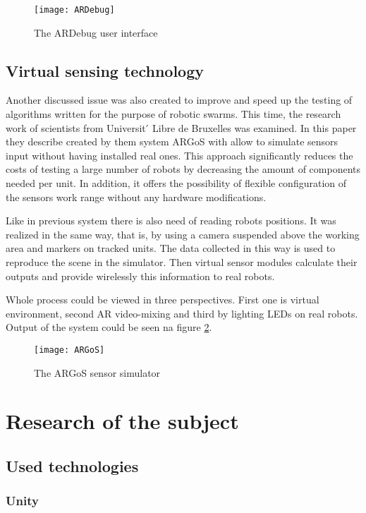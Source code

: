 \documentclass[printmode,en]{mgr}
\begin{document}
\begin{figure}[!ht]
  \centering
    \texttt{[image: ARDebug]}
  \caption{The ARDebug user interface \cite{ARDebug}}
  \label{fig:ARDebug}
\end{figure}

\section{Virtual sensing technology}
Another discussed issue was also created to improve and speed up the testing of algorithms written for the purpose of robotic swarms. This time, the research work \cite{ARGoS} of scientists from Universit ́ Libre de Bruxelles was examined. In this paper they describe created by them system ARGoS with allow to simulate sensors input without having installed real ones. This approach significantly reduces the costs of testing a large number of robots by decreasing the amount of components needed per unit. In addition, it offers the possibility of flexible configuration of the sensors work range without any hardware modifications.

Like in previous system there is also need of reading robots positions. It was realized in the same way, that is, by using a camera suspended above the working area and markers on tracked units. The data collected in this way is used to reproduce the scene in the simulator. Then virtual sensor modules calculate their outputs and provide wirelessly this information to real robots.

Whole process could be viewed in three perspectives. First one is virtual environment, second AR video-mixing and third by lighting LEDs on real robots. Output of the system could be seen na figure \ref{fig:ARGoS}.

\begin{figure}[!ht]
  \centering
    \texttt{[image: ARGoS]}
  \caption{The ARGoS sensor simulator \cite{ARGoS}}
  \label{fig:ARGoS}
\end{figure}

\chapter{Research of the subject}

\section{Used technologies}

\subsection{Unity}
\end{document}
